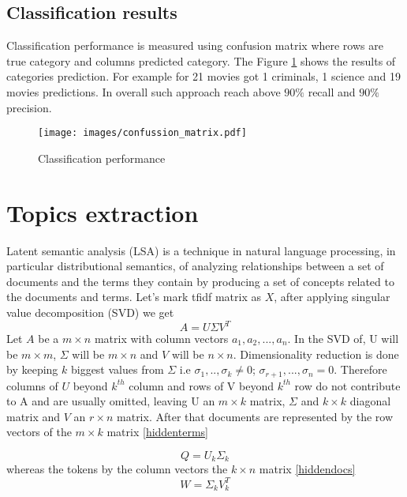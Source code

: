 \documentclass{article}
\begin{document}
\subsection{Classification results}
Classification performance is measured using confusion matrix where rows are true category and columns predicted category. The  Figure \ref{confusion matrix} shows the results of categories prediction. For example  for 21 movies  got 1 criminals, 1 science and 19 movies predictions. In overall such approach reach above $90 \%$  recall and $90 \%$ precision.
\begin{figure}[H]
  \texttt{[image: images/confussion\_matrix.pdf]}
  \caption{Classification performance}
  \label{confusion matrix}
\end{figure}

\section{Topics extraction}
Latent semantic analysis (LSA) is a technique in natural language processing, in particular distributional semantics, of analyzing relationships between a set of documents and the terms they contain by producing a set of concepts related to the documents and terms. Let's mark tfidf matrix as $X$, after applying singular value decomposition (SVD) we get 
\begin{equation}
\label{LSA}
A =U\Sigma V^T
\end{equation}
Let $A$ be a $m \times n$ matrix with column vectors $a_1, a_2, ..., a_n$. In the SVD of, U will be $m \times m$, $\Sigma$ will be $m \times n$ and $V$ will be $n \times n$. Dimensionality reduction is done by keeping  $k$ biggest  values from $\Sigma$ i.e $\sigma_1,..,\sigma_k \neq 0$; $\sigma_{r+1},...,\sigma_n = 0$. Therefore columns of $U$ beyond $k^{th}$ column and rows of V beyond $k^{th}$ row do not contribute to A and are usually omitted, leaving U an  $m \times k$ matrix, $\Sigma$ and  $k \times k$ diagonal matrix and $V$ an  $r \times n$ matrix. After that documents are represented by the row vectors of the $m \times k$ matrix \ref{hiddenterms}

\begin{equation}
\label{hiddenterms}
Q = U_k\Sigma_k
\end{equation}
whereas the tokens by the column vectors the $k \times n$ matrix \ref{hiddendocs}
 \begin{equation}
\label{hiddendocs}
W =\Sigma_kV_k^T
\end{equation}
\end{document}

